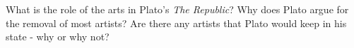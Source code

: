 \needspace{2cm}
\question[5] What is the role of the arts in Plato's \textit{The Republic}?
Why does Plato argue for the removal of most artists?
Are there any artists that Plato would keep in his state - why or why not?
\vspace{6cm}
